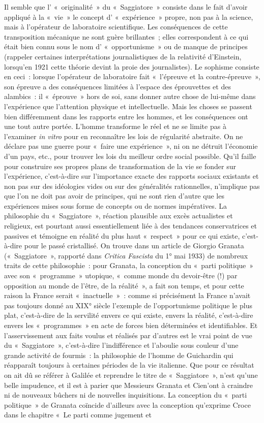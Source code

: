 \documentclass[french,twoside]{book} %
\begin{document}
Il semble que l’ « originalité » du « Saggiatore » consiste dans le fait d’avoir appliqué à la « vie » le concept d’ « expérience » propre, non pas à la science, mais à l’opérateur de laboratoire scientifique. Les conséquences de cette transposition mécanique ne sont guère brillantes ; elles correspondent à ce qui était bien connu sous le nom d’ « opportunisme » ou de manque de principes (rappeler certaines interprétations journalistiques de la relativité d’Einstein, lorsqu’en 1921 cette théorie devint la proie des journalistes). Le sophisme consiste en ceci : lorsque l’opérateur de laboratoire fait « l’épreuve et la contre-épreuve », son épreuve a des conséquences limitées à l’espace des éprouvettes et des alambics : il « éprouve » hors de soi, sans donner autre chose de lui-même dans l’expérience que l’attention physique et intellectuelle. Mais les choses se passent bien différemment dans les rapports entre les hommes, et les conséquences ont une tout autre portée. L'homme transforme le réel et ne se limite pas à l’examiner \emph{in vitro} pour en reconnaître les lois de régularité abstraite. On ne déclare pas une guerre pour « faire une expérience », ni on ne détruit l’économie d’un pays, etc., pour trouver les lois du meilleur ordre social possible. Qu'il faille pour construire ses propres plans de transformation de la vie se fonder sur l’expérience, c’est-à-dire sur l’importance exacte des rapports sociaux existants et non pas sur des idéologies vides ou sur des généralités rationnelles, n’implique pas que l’on ne doit pas avoir de principes, qui ne sont rien d’autre que les expériences mises sous forme de concepts ou de normes impératives. La philosophie du « Saggiatore », réaction plausible aux excès actualistes et religieux, est pourtant aussi essentiellement liée à des tendances conservatrices et passives et témoigne en réalité du plus haut « respect » pour ce qui existe, c’est-à-dire pour le passé cristallisé. On trouve dans un article de Giorgio Granata (« Saggiatore », rapporté dans \emph{Critica Fascista} du 1° mai 1933) de nombreux traits de cette philosophie : pour Granata, la conception du « parti politique » avec son « programme » utopique, « comme monde du devoir-être (!) par opposition au monde de l’être, de la réalité », a fait son temps, et pour cette raison la France serait « inactuelle » : comme si précisément la France n’avait pas toujours donné au XIX° siècle l’exemple de l’opportunisme politique le plus plat, c’est-à-dire de la servilité envers ce qui existe, envers la réalité, c’est-à-dire envers les « programmes » en acte de forces bien déterminées et identifiables. Et l’asservissement aux faits voulus et réalisés par d’autres est le vrai point de vue du « Saggiatore », c’est-à-dire l’indifférence et l’aboulie sous couleur d’une grande activité de fourmis : la philosophie de l’homme de Guichardin qui réapparaît toujours à certaines périodes de la vie italienne. Que pour ce résultat on ait dû se référer à Galilée et reprendre le titre de « Saggiatore », n’est qu’une belle impudence, et il est à parier que Messieurs Granata et Cien’ont à craindre ni de nouveaux bûchers ni de nouvelles inquisitions. La conception du « parti politique » de Granata coïncide d’ailleurs avec la conception qu’exprime Croce dans le chapitre « Le parti comme jugement et 
\end{document}
